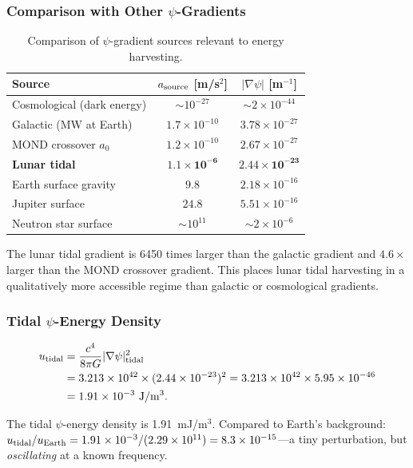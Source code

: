 \documentclass[aps,prd,twocolumn,superscriptaddress]{revtex4-2}
\begin{document}
\subsubsection{Comparison with Other $\psi$-Gradients}

\begin{table}[h]
\caption{Comparison of $\psi$-gradient sources relevant to energy harvesting.}
\label{tab:psi-sources}
\begin{ruledtabular}
\begin{tabular}{lcc}
Source & $a_{\rm source}$ [m/s$^2$] & $|\nabla\psi|$ [m$^{-1}$] \\
\hline
Cosmological (dark energy) & $\sim 10^{-27}$ & $\sim 2\times 10^{-44}$ \\
Galactic (MW at Earth) & $1.7\times 10^{-10}$ & $3.78\times 10^{-27}$ \\
MOND crossover $a_0$ & $1.2\times 10^{-10}$ & $2.67\times 10^{-27}$ \\
\textbf{Lunar tidal} & $\mathbf{1.1\times 10^{-6}}$ & $\mathbf{2.44\times 10^{-23}}$ \\
Earth surface gravity & $9.8$ & $2.18\times 10^{-16}$ \\
Jupiter surface & $24.8$ & $5.51\times 10^{-16}$ \\
Neutron star surface & $\sim 10^{11}$ & $\sim 2\times 10^{-6}$ \\
\end{tabular}
\end{ruledtabular}
\end{table}

The lunar tidal gradient is 6450 times larger than the galactic
gradient and $4.6\times$ larger than the MOND crossover gradient.
This places lunar tidal harvesting in a qualitatively more
accessible regime than galactic or cosmological gradients.

\subsubsection{Tidal $\psi$-Energy Density}

\begin{align}
u_{\rm tidal} &= \frac{c^4}{8\pi G}|\nabla\psi|_{\rm tidal}^2 \notag\\
&= 3.213\times 10^{42}\times(2.44\times 10^{-23})^2
= 3.213\times 10^{42}\times 5.95\times 10^{-46} \notag\\
&= 1.91\times 10^{-3}~\mathrm{J/m^3}.
\end{align}

The tidal $\psi$-energy density is 1.91~mJ/m$^3$.  Compared to Earth's
background: $u_{\rm tidal}/u_{\rm Earth} = 1.91\times 10^{-3}/(2.29\times 10^{11})
= 8.3\times 10^{-15}$---a tiny perturbation, but \emph{oscillating} at
a known frequency.
\end{document}
